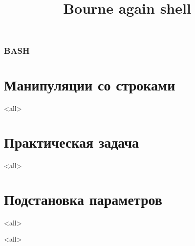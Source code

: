 
\title[bash]{Bourne again shell}




\begin{frame}
	\frametitle{BASH}
	\titlepage
	\vspace{-0.5cm}
	\begin{center}
	\end{center}
\end{frame}

\begin{frame}
	\tableofcontents
	[hideallsubsections]
\end{frame}


\section{Манипуляции со строками}

\mode<all>{}

\section{Практическая задача}

\mode<all>{}

\section{Подстановка параметров}

\mode<all>{}

\mode<all>


